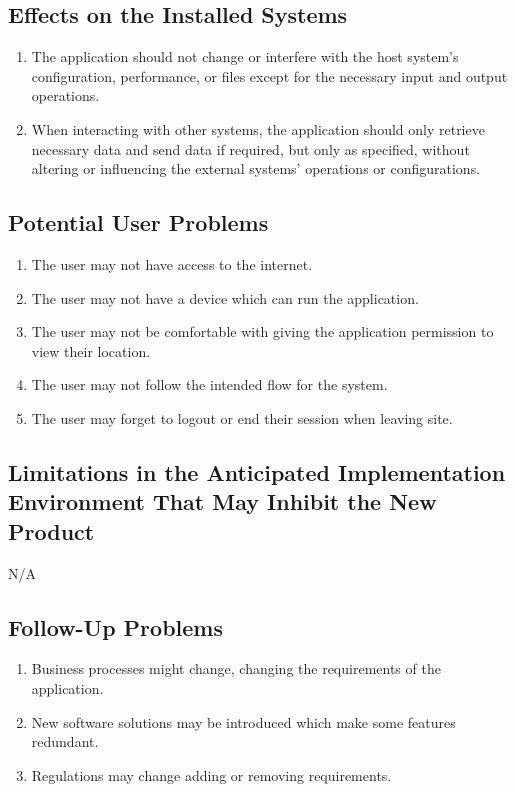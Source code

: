 \documentclass[12pt]{article}
\begin{document}
\subsection{Effects on the Installed Systems}
\begin{enumerate}
  \item The application should not change or interfere with the host
    system's configuration, performance, or files except for the
    necessary input and output operations.
  \item When interacting with other systems, the application should
    only retrieve necessary data and send data if required, but only
    as specified, without altering or influencing the external
    systems' operations or configurations.
\end{enumerate}
\subsection{Potential User Problems}
\begin{enumerate}
  \item The user may not have access to the internet.
  \item The user may not have a device which can run the application.
  \item The user may not be comfortable with giving the application
    permission to view their location.
  \item The user may not follow the intended flow for the system.
  \item The user may forget to logout or end their session when leaving site.
\end{enumerate}
\subsection{Limitations in the Anticipated Implementation Environment That May
Inhibit the New Product}
N/A
\subsection{Follow-Up Problems}
\begin{enumerate}
  \item Business processes might change, changing the requirements of
    the application.
  \item New software solutions may be introduced which make some
    features redundant.
  \item Regulations may change adding or removing requirements.
\end{enumerate}
\end{document}
